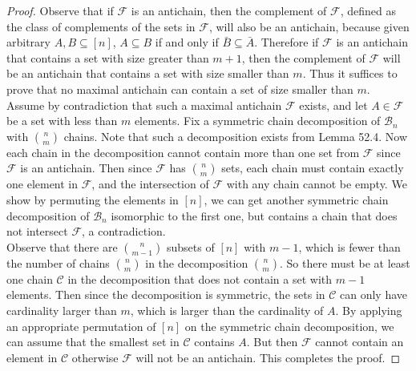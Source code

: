 \documentclass{article}
\begin{document}
\begin{enumerate}
\begin{enumerate}
        \begin{proof}
          Observe that if $\mathcal{F}$ is an antichain, then the
          complement of $\mathcal{F}$, defined as the class of complements
          of the sets in $\mathcal{F}$, will also be an antichain, because
          given arbitrary $A,B\subseteq[n]$, $A\subseteq B$ if and only if
          $\bar{B}\subseteq\bar{A}$. Therefore if $\mathcal{F}$ is an
          antichain that contains a set with size greater than $m+1$, then
          the complement of $\mathcal{F}$ will be an antichain that
          contains a set with size smaller than $m$. Thus it suffices to
          prove that no maximal antichain can contain a set of size smaller
          than $m$. \\

          Assume by contradiction that such a maximal antichain
          $\mathcal{F}$ exists, and let $A\in\mathcal{F}$ be a set with
          less than $m$ elements. Fix a symmetric chain decomposition of
          $\mathcal{B}_n$ with $\binom{n}{m}$ chains. Note that such a
          decomposition exists from Lemma 52.4. Now each chain in the
          decomposition cannot contain more than one set from $\mathcal{F}$
          since $\mathcal{F}$ is an antichain. Then since $\mathcal{F}$ has
          $\binom{n}{m}$ sets, each chain must contain exactly one element
          in $\mathcal{F}$, and the intersection of $\mathcal{F}$ with any
          chain cannot be empty. We show by permuting the elements in
          $[n]$, we can get another symmetric chain decomposition of
          $\mathcal{B}_n$ isomorphic to the first one, but contains a chain
          that does not intersect $\mathcal{F}$, a contradiction. \\

          Observe that there are $\binom{n}{m-1}$ subsets of $[n]$ with
          $m-1$, which is fewer than the number of chains $\binom{n}{m}$ in
          the decomposition $\binom{n}{m}$. So there must be at least one
          chain $\mathcal{C}$ in the decomposition that does not contain a
          set with $m-1$ elements. Then since the decomposition is
          symmetric, the sets in $\mathcal{C}$ can only have cardinality
          larger than $m$, which is larger than the cardinality of $A$. By
          applying an appropriate permutation of $[n]$ on the symmetric
          chain decomposition, we can assume that the smallest set in
          $\mathcal{C}$ contains $A$. But then $\mathcal{F}$ cannot contain
          an element in $\mathcal{C}$ otherwise $\mathcal{F}$ will not be
          an antichain. This completes the proof.
        \end{proof}


\end{enumerate}
\end{enumerate}
\end{document}
